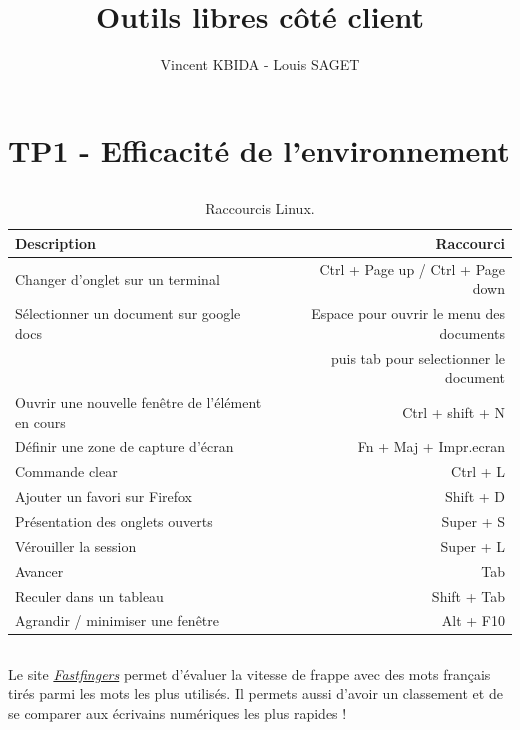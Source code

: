 \documentclass{article}
\title{Outils libres côté client}
\author{Vincent KBIDA - Louis SAGET}
\begin{document}
\maketitle

\section{TP1 - Efficacité de l'environnement}

\subsection{}

\begin{table}[h]
\centering
\begin{tabular}{l|r}

Description & Raccourci \\\hline
Changer d’onglet sur un terminal & Ctrl + Page up / Ctrl + Page down \\
\hline
Sélectionner un document sur google docs & Espace pour ouvrir le menu des documents \\
 & puis tab pour selectionner le document \\
\hline
Ouvrir une nouvelle fenêtre de l’élément en cours & Ctrl + shift + N\\
\hline
Définir une zone de capture d’écran & Fn + Maj + Impr.ecran\\
\hline
Commande clear & Ctrl + L\\
\hline
Ajouter un favori sur Firefox & Shift + D\\
\hline
Présentation des onglets ouverts & Super + S\\
\hline
Vérouiller la session & Super + L\\
\hline
Avancer & Tab\\
\hline
Reculer dans un tableau & Shift + Tab\\
\hline
Agrandir / minimiser une fenêtre & Alt + F10


\end{tabular}
\caption{\label{tab:widgets}Raccourcis Linux.}
\end{table}

\subsection{}

Le site \href{https://10fastfingers.com/typing-test/french}{\emph{Fastfingers}} permet d’évaluer la vitesse de frappe avec des mots français tirés parmi les mots les plus utilisés. Il permets aussi d'avoir un classement et de se comparer aux écrivains numériques les plus rapides !
\end{document}
